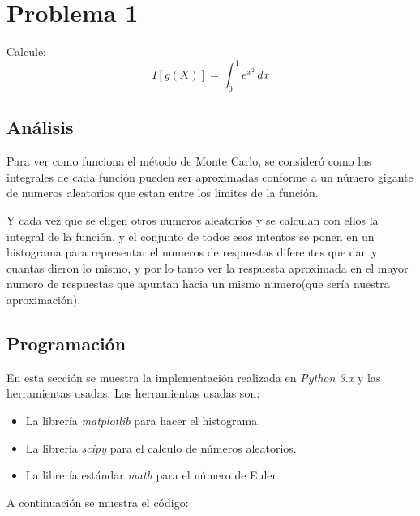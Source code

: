 \documentclass[a4paper,12pt]{article}
\begin{document}
    \section{Problema 1}
    Calcule:
    \begin{equation}
        I[g(X)] = \int_{0}^{1} e^{x^2} \,dx
    \end{equation}
    \clearpage
    \subsection{Análisis}
    Para ver como funciona el método de Monte Carlo, se consideró como las integrales
    de cada función pueden ser aproximadas conforme a un número gigante de numeros aleatorios
    que estan entre los limites de la función. 
    
    Y cada vez que se eligen otros numeros aleatorios
    y se calculan con ellos la integral de la función, y el conjunto de todos esos intentos
    se ponen en un histograma para representar el numeros de respuestas diferentes que dan y cuantas
    dieron lo mismo, y por lo tanto ver la respuesta aproximada en el mayor numero de respuestas que apuntan
    hacia un mismo numero(que sería nuestra aproximación).

    \subsection{Programación}    
    En esta sección se muestra la implementación realizada en 
    \emph{Python 3.x} y las herramientas usadas.
    Las herramientas usadas son:
    \begin{itemize}
        \item La librería \emph{matplotlib} para hacer el histograma.
        \item La librería \emph{scipy} para el calculo de números aleatorios.
        \item La librería estándar \emph{math} para el número de Euler.
    \end{itemize}

    A continuación se muestra el código:
    
\end{document}
